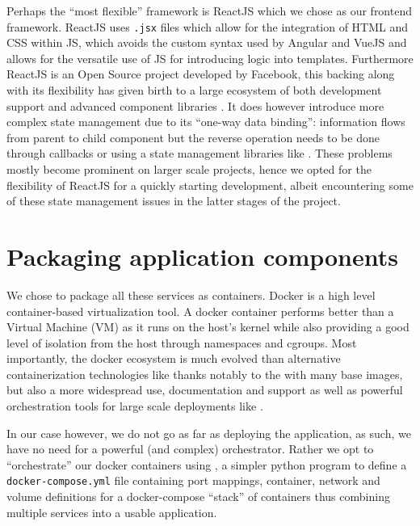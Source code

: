\documentclass[\version]{l4proj}
\begin{document}
Perhaps the ``most flexible'' framework is ReactJS which we chose as our frontend framework.
ReactJS uses \lstinline{.jsx} files which allow for the integration of HTML and CSS within JS, which avoids the custom syntax used by Angular and VueJS and allows for the versatile use of JS for introducing logic into templates.
Furthermore ReactJS is an Open Source project developed by Facebook, this backing along with its flexibility has given birth to a large ecosystem of both development support and advanced component libraries \autocite{wohlgethanSupportingWebDevelopmentDecisions2018}.
It does however introduce more complex state management due to its ``one-way data binding'': information flows from parent to child component but the reverse operation needs to be done through callbacks or using a state management libraries like \textcite{Redux2020}.
These problems mostly become prominent on larger scale projects, hence we opted for the flexibility of ReactJS for a quickly starting development, albeit encountering some of these state management issues in the latter stages of the project.

\section{Packaging application components}

We chose to package all these services as \textcite{Docker2020} containers.
Docker is a high level container-based virtualization tool.
A docker container performs better than a Virtual Machine (VM) as it runs on the host's kernel while also providing a good level of isolation from the host through namespaces and cgroups.
Most importantly, the docker ecosystem is much evolved than alternative containerization technologies like \textcite{Lxc2020} thanks notably to the \textcite{DockerHub} with many base images, but also a more widespread use, documentation and support as well as powerful orchestration tools for large scale deployments like \textcite{Kubernetes2020}.

In our case however, we do not go as far as deploying the application, as such, we have no need for a powerful (and complex) orchestrator.
Rather we opt to ``orchestrate'' our docker containers using \textcite{DockerCompose2020}, a simpler python program to define a \verb|docker-compose.yml| file containing port mappings, container, network and volume definitions for a docker-compose ``stack'' of containers thus combining multiple services into a usable application.
\end{document}
